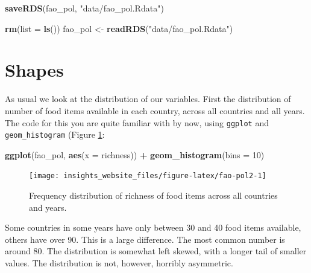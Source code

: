 \documentclass[]{book}
\newenvironment{Shaded}{\begin{snugshade}}{\end{snugshade}}
\newcommand{\DataTypeTok}[1]{\textcolor[rgb]{0.13,0.29,0.53}{#1}}
\newcommand{\DecValTok}[1]{\textcolor[rgb]{0.00,0.00,0.81}{#1}}
\newcommand{\KeywordTok}[1]{\textcolor[rgb]{0.13,0.29,0.53}{\textbf{#1}}}
\newcommand{\NormalTok}[1]{#1}
\newcommand{\OperatorTok}[1]{\textcolor[rgb]{0.81,0.36,0.00}{\textbf{#1}}}
\newcommand{\StringTok}[1]{\textcolor[rgb]{0.31,0.60,0.02}{#1}}
\begin{document}
\begin{Shaded}
\begin{Highlighting}[]
\KeywordTok{saveRDS}\NormalTok{(fao_pol, }\StringTok{"data/fao_pol.Rdata"}\NormalTok{)}
\end{Highlighting}
\end{Shaded}

\begin{Shaded}
\begin{Highlighting}[]
\KeywordTok{rm}\NormalTok{(}\DataTypeTok{list =} \KeywordTok{ls}\NormalTok{())}
\NormalTok{fao_pol <-}\StringTok{ }\KeywordTok{readRDS}\NormalTok{(}\StringTok{"data/fao_pol.Rdata"}\NormalTok{)}
\end{Highlighting}
\end{Shaded}

\hypertarget{shapes}{%
\section{Shapes}\label{shapes}}

As usual we look at the distribution of our variables. First the distribution of number of food items available in each country, across all countries and all years. The code for this you are quite familiar with by now, using \texttt{ggplot} and \texttt{geom\_histogram} (Figure \ref{fig:fao-pol2}:

\begin{Shaded}
\begin{Highlighting}[]
\KeywordTok{ggplot}\NormalTok{(fao_pol, }\KeywordTok{aes}\NormalTok{(}\DataTypeTok{x =}\NormalTok{ richness)) }\OperatorTok{+}
\StringTok{  }\KeywordTok{geom_histogram}\NormalTok{(}\DataTypeTok{bins =} \DecValTok{10}\NormalTok{)}
\end{Highlighting}
\end{Shaded}

\begin{figure}

{\centering \texttt{[image: insights\_website\_files/figure-latex/fao-pol2-1]} 

}

\caption{Frequency distribution of richness of food items across all countries and years.}\label{fig:fao-pol2}
\end{figure}

Some countries in some years have only between 30 and 40 food items available, others have over 90. This is a large difference. The most common number is around 80. The distribution is somewhat left skewed, with a longer tail of smaller values. The distribution is not, however, horribly asymmetric.
\end{document}
